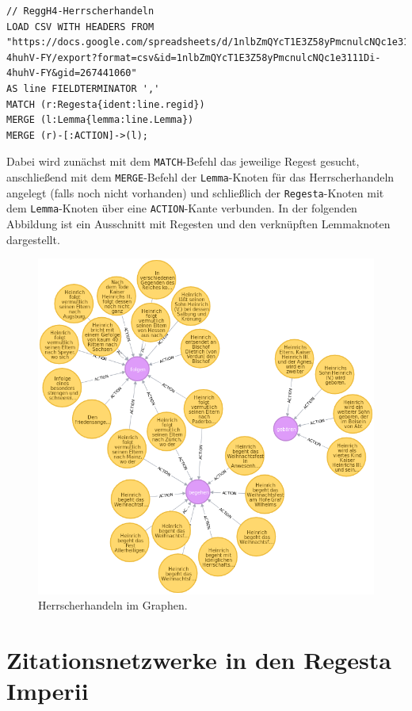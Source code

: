 \documentclass[ngerman,]{scrreprt}
\begin{document}
\begin{verbatim}
// ReggH4-Herrscherhandeln
LOAD CSV WITH HEADERS FROM "https://docs.google.com/spreadsheets/d/1nlbZmQYcT1E3Z58yPmcnulcNQc1e3111Di-4huhV-FY/export?format=csv&id=1nlbZmQYcT1E3Z58yPmcnulcNQc1e3111Di-4huhV-FY&gid=267441060"
AS line FIELDTERMINATOR ','
MATCH (r:Regesta{ident:line.regid})
MERGE (l:Lemma{lemma:line.Lemma})
MERGE (r)-[:ACTION]->(l);
\end{verbatim}

Dabei wird zunächst mit dem \texttt{MATCH}-Befehl das jeweilige Regest gesucht, anschließend mit dem \texttt{MERGE}-Befehl der \texttt{Lemma}-Knoten für das Herrscherhandeln angelegt (falls noch nicht vorhanden) und schließlich der \texttt{Regesta}-Knoten mit dem \texttt{Lemma}-Knoten über eine \texttt{ACTION}-Kante verbunden. In der folgenden Abbildung ist ein Ausschnitt mit Regesten und den verknüpften Lemmaknoten dargestellt.

\begin{figure}
\centering
\includegraphics{Bilder/RI2Graph/ReggH4-Action.png}
\caption{Herrscherhandeln im Graphen.}
\end{figure}

\hypertarget{zitationsnetzwerke-in-den-regesta-imperii}{%
\section{Zitationsnetzwerke in den Regesta Imperii}\label{zitationsnetzwerke-in-den-regesta-imperii}}
\end{document}
